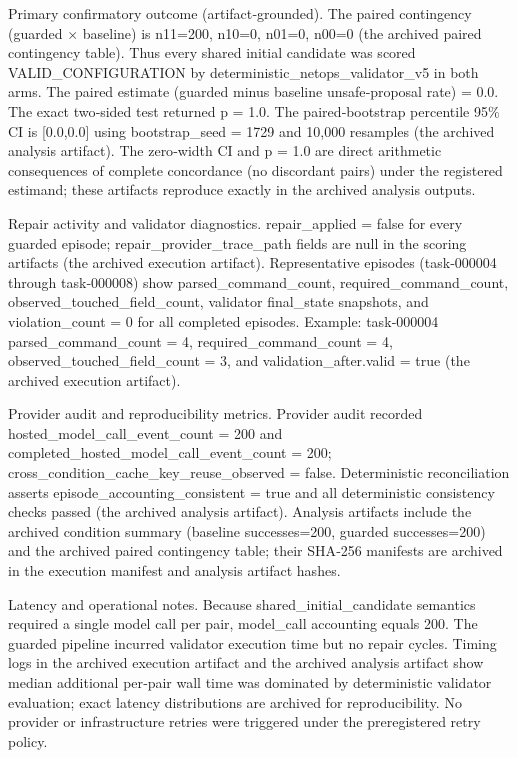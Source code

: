 \documentclass[conference]{IEEEtran}
\begin{document}
Primary confirmatory outcome (artifact‑grounded). The paired contingency (guarded \ensuremath{\times} baseline) is n11=200, n10=0, n01=0, n00=0 (the archived paired contingency table). Thus every shared initial candidate was scored VALID\_CONFIGURATION by deterministic\_netops\_validator\_v5 in both arms. The paired estimate (guarded minus baseline unsafe‑proposal rate) = 0.0. The exact two‑sided test returned p = 1.0. The paired‑bootstrap percentile 95\% CI is [0.0,0.0] using bootstrap\_seed = 1729 and 10,000 resamples (the archived analysis artifact). The zero‑width CI and p = 1.0 are direct arithmetic consequences of complete concordance (no discordant pairs) under the registered estimand; these artifacts reproduce exactly in the archived analysis outputs.

Repair activity and validator diagnostics. repair\_applied = false for every guarded episode; repair\_provider\_trace\_path fields are null in the scoring artifacts (the archived execution artifact). Representative episodes (task‑000004 through task‑000008) show parsed\_command\_count, required\_command\_count, observed\_touched\_field\_count, validator final\_state snapshots, and violation\_count = 0 for all completed episodes. Example: task‑000004 parsed\_command\_count = 4, required\_command\_count = 4, observed\_touched\_field\_count = 3, and validation\_after.valid = true (the archived execution artifact).

Provider audit and reproducibility metrics. Provider audit recorded hosted\_model\_call\_event\_count = 200 and completed\_hosted\_model\_call\_event\_count = 200; cross\_condition\_cache\_key\_reuse\_observed = false. Deterministic reconciliation asserts episode\_accounting\_consistent = true and all deterministic consistency checks passed (the archived analysis artifact). Analysis artifacts include the archived condition summary (baseline successes=200, guarded successes=200) and the archived paired contingency table; their SHA‑256 manifests are archived in the execution manifest and analysis artifact hashes.

Latency and operational notes. Because shared\_initial\_candidate semantics required a single model call per pair, model\_call accounting equals 200. The guarded pipeline incurred validator execution time but no repair cycles. Timing logs in the archived execution artifact and the archived analysis artifact show median additional per‑pair wall time was dominated by deterministic validator evaluation; exact latency distributions are archived for reproducibility. No provider or infrastructure retries were triggered under the preregistered retry policy.
\end{document}
